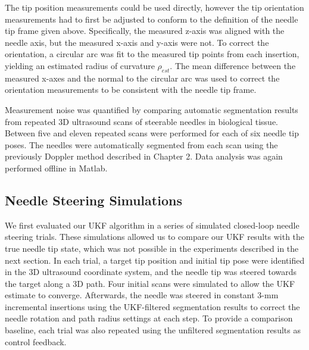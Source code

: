 The tip position measurements could be used directly, however the tip orientation measurements had to first be adjusted to conform to the definition of the needle tip frame given above. Specifically, the measured z-axis was aligned with the needle axis, but the measured x-axis and y-axis were not. To correct the orientation, a circular arc was fit to the measured tip points from each insertion, yielding an estimated radius of curvature $\rho_{est}$. The mean difference between the measured x-axes and the normal to the circular arc was used to correct the orientation measurements to be consistent with the needle tip frame.

Measurement noise was quantified by comparing automatic segmentation results from repeated 3D ultrasound scans of steerable needles in biological tissue. Between five and eleven repeated scans were performed for each of six needle tip poses. The needles were automatically segmented from each scan using the previously Doppler method described in Chapter 2. Data analysis was again performed offline in Matlab.

\subsection{Needle Steering Simulations}
We first evaluated our UKF algorithm in a series of simulated closed-loop needle steering trials. These simulations allowed us to compare our UKF results with the true needle tip state, which was not possible in the experiments described in the next section. In each trial, a target tip position and initial tip pose were identified in the 3D ultrasound coordinate system, and the needle tip was steered towards the target along a 3D path. Four initial scans were simulated to allow the UKF estimate to converge. Afterwards, the needle was steered in constant 3-mm incremental insertions using the UKF-filtered segmentation results to correct the needle rotation and path radius settings at each step. To provide a comparison baseline, each trial was also repeated using the unfiltered segmentation results as control feedback. 

